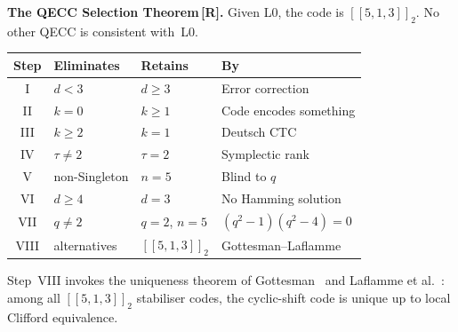 \documentclass[11pt,a4paper]{article}
\newcommand{\Rmark}{\textcolor{green!50!black}{\textbf{[R]}}}
\newcommand{\Cq}[4]{[\![#1,#2,#3]\!]_{#4}}
\begin{document}
\begin{mdframed}[backgroundcolor=Rbg,linecolor=Rcolor,linewidth=2pt]
\textbf{The QECC Selection Theorem\,\Rmark.}\quad
Given L0, the code is $\Cq{5}{1}{3}{2}$. No other QECC is consistent with~L0.

\smallskip\noindent
\renewcommand{\arraystretch}{1.25}
\begin{center}
\begin{tabular}{clll}
\toprule
\textbf{Step} & \textbf{Eliminates} & \textbf{Retains} & \textbf{By} \\
\midrule
I    & $d<3$            & $d\geq3$               & Error correction \\
II   & $k=0$            & $k\geq1$               & Code encodes something \\
III  & $k\geq2$         & $k=1$                  & Deutsch CTC \\
IV   & $\tau\neq2$      & $\tau=2$               & Symplectic rank \\
V    & non-Singleton    & $n=5$                  & Blind to $q$ \\
VI   & $d\geq4$         & $d=3$                  & No Hamming solution \\
VII  & $q\neq2$         & $q=2$, $n=5$           & $(q^2-1)(q^2-4)=0$ \\
VIII & alternatives     & $\Cq{5}{1}{3}{2}$      & Gottesman--Laflamme \\
\bottomrule
\end{tabular}
\end{center}
\end{mdframed}

\noindent
Step~VIII invokes the uniqueness theorem of Gottesman~\cite{Gottesman1996} and Laflamme et al.~\cite{Laflamme1996}: among all $[\![5,1,3]\!]_2$ stabiliser codes, the cyclic-shift code is unique up to local Clifford equivalence.
\end{document}
